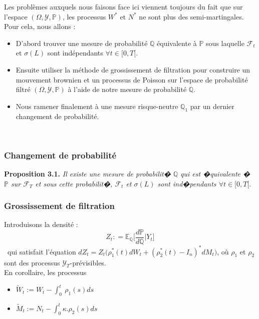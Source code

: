 \documentclass[11pt,letterpaper]{article}
\makeatletter
\newcommand{\mathcenter}{\@fleqnfalse}
\makeatother
\begin{document}
Les problèmes auxquels nous faisons face ici viennent toujours du fait que sur l'espace $(\Omega, \mathcal{Y}, \mathbb{P})$, les processus $W^*$ et $N^*$ ne sont plus des semi-martingales. Pour cela, nous allons : \\
\begin{itemize}
\item D'abord trouver une mesure de probabilité $\mathbb{Q}$ équivalente à $\mathbb{P}$ sous laquelle $\mathcal{F}_t$ et $\sigma(L)$ sont indépendants $\forall t \in [0, T[$.\
\item Ensuite utiliser la méthode de grossissement de filtration pour construire un mouvement brownien et un processus de Poisson sur l'espace de probabilité filtré $(\Omega, \mathcal{Y}, \mathbb{P})$ à l'aide de notre mesure de probabilité $\mathbb{Q}$.
\item Nous ramener finalement à une mesure risque-neutre $\mathbb{Q}_1$ par un dernier changement de probabilité. 
\end{itemize}
\

\subsubsection{Changement de probabilité}
\textbf{Proposition 3.1.} \textit{Il existe une mesure de probabilit� $\mathbb{Q}$ qui est �quivalente � $\mathbb{P}$ sur $\mathcal{F}_T$ et sous cette probabilit�, $\mathcal{F}_t$ et $\sigma(L)$ sont ind�pendants $\forall t \in [0, T[$}.\\

\subsubsection{Grossissement de filtration}
Introduisons la densité : 
\mathcenter
\begin{equation*}
\displaystyle Z_t : = \mathbb{E}_{\mathbb{Q}}\Big[\frac{d\mathbb{P}}{d\mathbb{Q}}|Y_t\Big]
\end{equation*}
\
qui satisfait l'équation $\displaystyle dZ_t = Z_t\Big(\rho^*_1 (t) dW_t + (\rho^*_2 (t) - I_n)^* dM_t\Big)$, où $\rho_1$ et $\rho_2$ sont des processus $\mathcal{Y}_T$-prévisibles.\\

En corollaire, les processus \\

\begin{itemize}
\item $\displaystyle \widetilde{W}_t := W_t - \int_{0}^{t}\ \rho_1(s) ds$\
\item $\displaystyle \widetilde{M}_t := N_t - \int_{0}^{t}\kappa.\rho_2 (s) ds$
\end{itemize}
\ 
\end{document}
